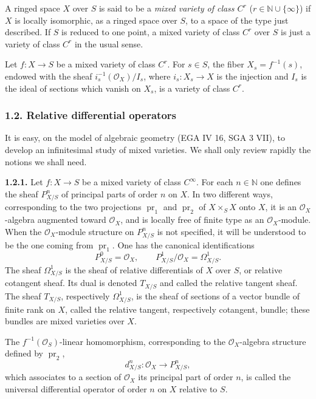 A ringed space $X$ over $S$ is said to be a \emph{mixed variety of class $C^r$} ($r\in\mathbb N\cup\{\infty\}$) if $X$ is locally isomorphic, as a ringed space over $S$, to a space of the type just described. If $S$ is reduced to one point, a mixed variety of class $C^r$ over $S$ is just a variety of class $C^r$ in the usual sense.

Let $f:X\to S$ be a mixed variety of class $C^r$. For $s\in S$, the fiber $X_s=f^{-1}(s)$, endowed with the sheaf $i_s^{-1}(\mathcal O_X)/I_s$, where $i_s:X_s\to X$ is the injection and $I_s$ is the ideal of sections which vanish on $X_s$, is a variety of class $C^r$.

\subsubsection*{1.2. Relative differential operators}

It is easy, on the model of algebraic geometry (EGA IV 16, SGA 3 VII), to develop an infinitesimal study of mixed varieties. We shall only review rapidly the notions we shall need.

\textbf{1.2.1.} Let $f:X\to S$ be a mixed variety of class $C^\infty$. For each $n\in\mathbb N$ one defines the sheaf $P^n_{X/S}$ of principal parts of order $n$ on $X$. In two different ways, corresponding to the two projections $\operatorname{pr}_1$ and $\operatorname{pr}_2$ of $X\times_SX$ onto $X$, it is an $\mathcal O_X$-algebra augmented toward $\mathcal O_X$, and is locally free of finite type as an $\mathcal O_X$-module. When the $\mathcal O_X$-module structure on $P^n_{X/S}$ is not specified, it will be understood to be the one coming from $\operatorname{pr}_1$. One has the canonical identifications
\[
 P^0_{X/S}=\mathcal O_X,
 \qquad
 P^1_{X/S}/\mathcal O_X=\Omega^1_{X/S}.
\]
The sheaf $\Omega^1_{X/S}$ is the sheaf of relative differentials of $X$ over $S$, or relative cotangent sheaf. Its dual is denoted $T_{X/S}$ and called the relative tangent sheaf. The sheaf $T_{X/S}$, respectively $\Omega^1_{X/S}$, is the sheaf of sections of a vector bundle of finite rank on $X$, called the relative tangent, respectively cotangent, bundle; these bundles are mixed varieties over $X$.

The $f^{-1}(\mathcal O_S)$-linear homomorphism, corresponding to the $\mathcal O_X$-algebra structure defined by $\operatorname{pr}_2$,
\[
 d^n_{X/S}:\mathcal O_X\longrightarrow P^n_{X/S},
\]
which associates to a section of $\mathcal O_X$ its principal part of order $n$, is called the universal differential operator of order $n$ on $X$ relative to $S$.

